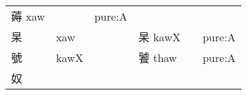 \documentclass[14pt,a4paper]{scrartcl}
\begin{document}
\begin{longtable}[c]{@{}llllll@{}}
\begin{minipage}[t]{0.14\columnwidth}
薅 xaw
\strut\end{minipage} &
\begin{minipage}[t]{0.14\columnwidth}\raggedright\strut
\strut\end{minipage} &
\begin{minipage}[t]{0.14\columnwidth}\raggedright\strut
pure:A
\strut\end{minipage}\tabularnewline
\begin{minipage}[t]{0.14\columnwidth}\raggedright\strut
杲
\strut\end{minipage} &
\begin{minipage}[t]{0.14\columnwidth}\raggedright\strut
xaw
\strut\end{minipage} &
\begin{minipage}[t]{0.14\columnwidth}\raggedright\strut
\strut\end{minipage} &
\begin{minipage}[t]{0.14\columnwidth}\raggedright\strut
杲 kawX
\strut\end{minipage} &
\begin{minipage}[t]{0.14\columnwidth}\raggedright\strut
\strut\end{minipage} &
\begin{minipage}[t]{0.14\columnwidth}\raggedright\strut
pure:A
\strut\end{minipage}\tabularnewline
\begin{minipage}[t]{0.14\columnwidth}\raggedright\strut
號
\strut\end{minipage} &
\begin{minipage}[t]{0.14\columnwidth}\raggedright\strut
kawX
\strut\end{minipage} &
\begin{minipage}[t]{0.14\columnwidth}\raggedright\strut
\strut\end{minipage} &
\begin{minipage}[t]{0.14\columnwidth}\raggedright\strut
饕 thaw
\strut\end{minipage} &
\begin{minipage}[t]{0.14\columnwidth}\raggedright\strut
\strut\end{minipage} &
\begin{minipage}[t]{0.14\columnwidth}\raggedright\strut
pure:A
\strut\end{minipage}\tabularnewline
\begin{minipage}[t]{0.14\columnwidth}\raggedright\strut
奴
\strut\end{minipage} &
\begin{minipage}[t]{0.14\columnwidth}\raggedright\strut

\end{minipage}
\end{longtable}
\end{document}
